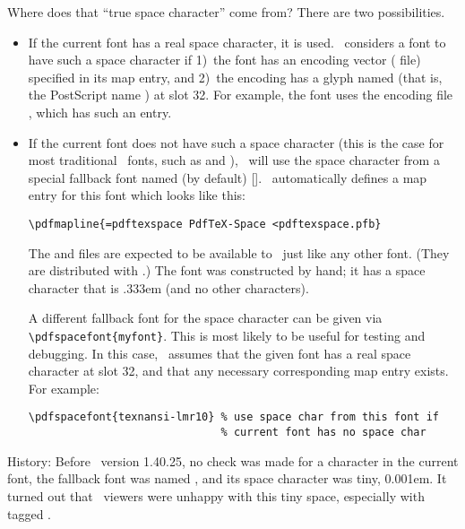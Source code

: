 \documentclass{pdftexmanual}
\begin{document}
Where does that ``true space character'' come from?
There are two possibilities.

\begin{itemize}
\item If the current font has a real space character, it is used. 
\PDFTEX\ considers a font to have such a space character if 1)~the font
has an encoding vector ( file) specified in its map entry,
and 2)~the encoding has a glyph named  (that is, the
PostScript name ) at slot 32. For example, the font
 uses the encoding file ,
which has such an entry.

\item
If the current font does not have such a space character (this is the
case for most traditional \TEX\ fonts, such as  and
), \PDFTEX\ will use the space character from a special
fallback font named (by default) [].
\PDFTEX\ automatically defines a map entry for this font which looks
like this:

\begin{verbatim}
\pdfmapline{=pdftexspace PdfTeX-Space <pdftexspace.pfb}
\end{verbatim}

The  and  files are expected
to be available to \PDFTEX\ just like any other font. (They are
distributed with \PDFTEX.) The  font was constructed
by hand; it has a space character that is .333em (and no other
characters).

A different fallback font for the space character can be given via
\verb|\pdfspacefont{myfont}|. This is most likely to be useful for
testing and debugging. In this case, \PDFTEX\ assumes that the given font
has a real space character at slot 32, and that any necessary
corresponding map entry exists. For example:

\begin{verbatim}
\pdfspacefont{texnansi-lmr10} % use space char from this font if
                              % current font has no space char
\end{verbatim}
\end{itemize}

History: Before \PDFTEX\ version 1.40.25, no check was made for a
 character in the current font, the fallback font was named
, and its space character was tiny, 0.001em. It turned
out that \PDF\ viewers were unhappy with this tiny space, especially
with tagged \PDF.
\end{document}
